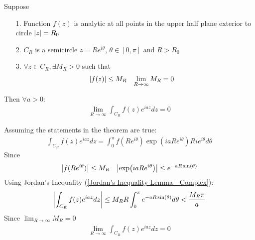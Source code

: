 \documentclass[12pt, english]{book}
\makeatletter
\renewenvironment{proof}[1][\proofname]{\par
	\pushQED{\qed}%
	\normalfont \topsep6\p@\@plus6\p@\relax
	\list{}{%
		\settowidth{\leftmargin}{\itshape\proofname:\hskip\labelsep}%
		\setlength{\labelwidth}{0pt}%
		\setlength{\itemindent}{-\leftmargin}%
	}%
	\item[\hskip\labelsep\itshape#1\@addpunct{:}]\ignorespaces
}{%
	\popQED\endlist\@endpefalse
}
\makeatother
\begin{document}
	\begin{theorem}
		\label{Jordan's Lemma - Complex}
		Suppose
		\begin{itemize}
			\item[1.] Function \(f(z)\) is analytic at all points in the upper half plane exterior to circle \(\abs{z} = R_0\)
			\item[2.] \(C_R\) is a semicircle \(z = Re^{i\theta}\), \(\theta \in [0,\pi]\) and \(R>R_0\)
			\item[3.] \(\forall z \in C_R, \exists M_R > 0\) such that 
			\begin{align*}
				\abs{f(z)} &\leq M_R	&	 \lim_{R \rightarrow \infty} M_R &= 0
			\end{align*}
		\end{itemize}
		Then \(\forall a > 0\):
		\begin{align*}
			\lim_{R \rightarrow \infty} \int_{C_R} f(z) e^{iaz} dz = 0
		\end{align*}
	\end{theorem}
	\begin{proof}
		Assuming the statements in the theorem are true:
		\begin{align*}
			\int_{C_R} f(z) e^{iaz} dz = \int_{0}^{\pi} f(Re^{i\theta}) \exp(iaRe^{i\theta}) Rie^{i\theta} d\theta
		\end{align*}
		Since 
		\begin{align*}
			\abs{f(Re^{i\theta})} &\leq M_R	& \abs{\exp(iaRe^{i\theta})} \leq e^{-aR\sin(\theta)}
		\end{align*}
		Using Jordan's Inequality (\cref{Jordan's Inequality Lemma - Complex}):
		\begin{align*}
			\abs{\int_{C_R} f(z) e^{iaz} dz} \leq M_R R \int_{0}^{\pi} e^{-aR \sin(\theta)} d\theta < \frac{M_R \pi}{a}
		\end{align*}
		Since \( \lim_{R \rightarrow \infty} M_R = 0\)
		\begin{align*}
			\lim_{R \rightarrow \infty} \int_{C_R} f(z) e^{iaz} dz = 0
		\end{align*}
	\end{proof}
	
	\begin{figure}[H]
		\centering
	\end{figure}
	
\end{document}
